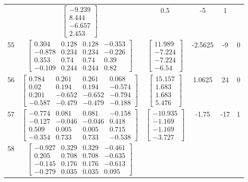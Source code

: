 \documentclass[a4paper,12pt]{article}
\begin{document}
\begin{tabular}{c c c c c c}
&
$\begin{bmatrix} -9.239 \\ 8.444 \\ -6.657 \\ 2.453 \end{bmatrix}$
&
0.5
&
-5
&
1
\\
55
&
$\begin{bmatrix} 0.304 & 0.128 & 0.128 & -0.353 \\ -0.878 & 0.234 & 0.234 & -0.226 \\ 0.353 & 0.74 & 0.74 & 0.39 \\ -0.109 & 0.244 & 0.244 & 0.82 \end{bmatrix}$
&
$\begin{bmatrix} 11.989 \\ -7.224 \\ -7.224 \\ -6.54 \end{bmatrix}$
&
-2.5625
&
-9
&
0
\\
56
&
$\begin{bmatrix} 0.784 & 0.261 & 0.261 & 0.068 \\ 0.02 & 0.194 & 0.194 & -0.574 \\ 0.201 & -0.652 & -0.652 & -0.794 \\ -0.587 & -0.479 & -0.479 & -0.188 \end{bmatrix}$
&
$\begin{bmatrix} 15.157 \\ 1.683 \\ 1.683 \\ 5.476 \end{bmatrix}$
&
1.0625
&
24
&
0
\\
57
&
$\begin{bmatrix} -0.774 & 0.081 & 0.081 & -0.158 \\ -0.127 & -0.046 & -0.046 & 0.418 \\ 0.509 & 0.005 & 0.005 & 0.715 \\ -0.354 & 0.733 & 0.733 & -0.538 \end{bmatrix}$
&
$\begin{bmatrix} -10.935 \\ -1.169 \\ -1.169 \\ -3.727 \end{bmatrix}$
&
-1.75
&
-17
&
1
\\
58
&
$\begin{bmatrix} -0.927 & 0.329 & 0.329 & -0.461 \\ 0.205 & 0.708 & 0.708 & -0.635 \\ -0.145 & 0.176 & 0.176 & -0.613 \\ -0.279 & 0.035 & 0.035 & 0.095 \end{bmatrix}$

\end{tabular}
\end{document}
